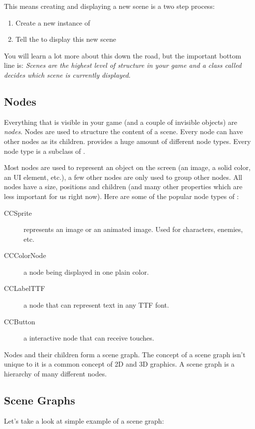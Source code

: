 This means creating and displaying a new scene is a two step process:
\begin{enumerate}
\item Create a new instance of \ccscene{}
\item Tell the \ccdirector{} to display this new scene
\end{enumerate}

You will learn a lot more about this down the road, but the important bottom
line is: \textit{Scenes are the highest level of structure in your game and a
class called \ccdirector{} decides which scene is currently displayed}.

\subsection{Nodes}
Everything that is visible in your \cocos{} game (and a couple of invisible
objects) are \textit{nodes}. Nodes are used to structure the content of a scene.
Every node can have other nodes as its children. \cocos{} provides a huge amount
of different node types. Every node type is a subclass of \ccnode{}.

Most nodes are used to represent an object on the screen (an image, a solid
color, an UI element, etc.), a few other nodes are only used to group other
nodes. All nodes have a size, positions and children (and many other properties
which are less important for us right now). Here are some of the popular
node types of \cocos{}:

\begin{description}
  \item[CCSprite] represents an image or an animated image. Used for characters,
  enemies, etc.
  \item[CCColorNode] a node being displayed in one plain color.
  \item[CCLabelTTF] a node that can represent text in any TTF font.
  \item[CCButton] a interactive node that can receive touches.
\end{description}

Nodes and their children form a scene graph. The concept of a scene graph isn't
unique to \cocos{} it is a common concept of 2D and 3D graphics. A scene graph
is a hierarchy of many different nodes. 

\subsection{Scene Graphs}
Let's take a look at simple example of a scene graph:

